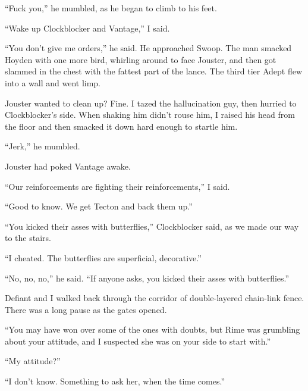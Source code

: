 ``Fuck you,'' he mumbled, as he began to climb to his feet.



``Wake up Clockblocker and Vantage,'' I said.



``You don't give me orders,'' he said.  He approached Swoop.  The man smacked Hoyden with one more bird, whirling around to face Jouster, and then got slammed in the chest with the fattest part of the lance.  The third tier Adept flew into a wall and went limp.



Jouster wanted to clean up?  Fine.  I tazed the hallucination guy, then hurried to Clockblocker's side.  When shaking him didn't rouse him, I raised his head from the floor and then smacked it down hard enough to startle him.



``Jerk,'' he mumbled.



Jouster had poked Vantage awake.



``Our reinforcements are fighting their reinforcements,'' I said.



``Good to know.  We get Tecton and back them up.''



``You kicked their asses with butterflies,'' Clockblocker said, as we made our way to the stairs.



``I cheated.  The butterflies are superficial, decorative.''



``No, no, no,'' he said.  ``If anyone asks, you kicked their asses with butterflies.''



\blacksquare



Defiant and I walked back through the corridor of double-layered chain-link fence.  There was a long pause as the gates opened.



``You may have won over some of the ones with doubts, but Rime was grumbling about your attitude, and I suspected she was on your side to start with.''



``My attitude?''



``I don't know.  Something to ask her, when the time comes.''



